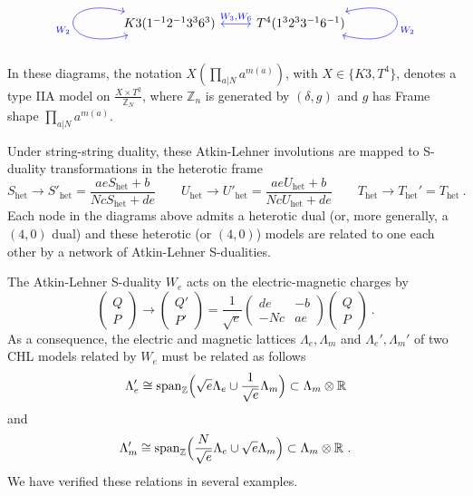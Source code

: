 \documentclass[a4paper,11pt]{article}
\newcommand{\RR}{\mathbb{R}}
\newcommand{\ZZ}{\mathbb{Z}}
\numberwithin{equation}{section}
\def\be{\begin{equation}}
\def\ee{\end{equation}}
\begin{document}
$$ \begin{tikzcd}
K3(1^{-1} 2^{-1} 3^3 6^3) \arrow[leftrightarrow,color=blue]{r}{W_3,W_{6}}\arrow[leftrightarrow,loop left,color=blue]{}{W_2} & 
T^4(1^3 2^3 3^{-1} 6^{-1})\arrow[leftrightarrow,loop right,color=blue]{}{W_2}
\end{tikzcd}
$$
In these diagrams, the notation $X(\prod_{a|N} a^{m(a)})$, with $X\in \{K3,T^4\}$, denotes a type IIA model on $\frac{X\times T^2}{\ZZ_N}$, where $\ZZ_n$ is generated by $(\delta,g)$ and $g$ has Frame shape $\prod_{a|N} a^{m(a)}$.

\medskip


Under string-string duality, these Atkin-Lehner involutions are mapped to S-duality transformations in the heterotic frame
\be S_{\text{het}}\to S'_{\text{het}}=\frac{ae S_{\text{het}}+b}{NcS_{\text{het}}+de}\qquad U_{\text{het}}\to U'_{\text{het}}=\frac{ae U_{\text{het}}+b}{NcU_{\text{het}}+de}\qquad T_{\text{het}}\to T_{\text{het}}'=T_{\text{het}}\ .
\ee Each node in the diagrams above admits a heterotic dual (or, more generally, a $(4,0)$ dual) and these heterotic (or $(4,0)$) models are related to one each other by a network of Atkin-Lehner S-dualities.

The Atkin-Lehner S-duality $W_e$ acts on the electric-magnetic charges by
\be \begin{pmatrix}
Q \\ P
\end{pmatrix}\to  \begin{pmatrix}
Q' \\ P'
\end{pmatrix}=\frac{1}{\sqrt{e}}\begin{pmatrix}
de & -b\\ -Nc & ae
\end{pmatrix} \begin{pmatrix}
Q \\ P
\end{pmatrix}\ .
\ee  As a consequence, the electric and magnetic lattices $\Lambda_e,\Lambda_m$ and $\Lambda_e',\Lambda_m'$ of two CHL models related by $W_e$ must be related as follows
\be \Lambda_e'\cong {\rm span}_\ZZ \Bigl(\sqrt{e}\Lambda_e\cup \frac{1}{\sqrt{e}}\Lambda_m\Bigr)\subset \Lambda_m\otimes \RR
\ee and
\be \Lambda_m'\cong {\rm span}_\ZZ \Bigl(\frac{N}{\sqrt{e}}\Lambda_e\cup \sqrt{e}\Lambda_m\Bigr)\subset \Lambda_m\otimes \RR\ .
\ee 
We have verified these relations in several examples.

\medskip
\end{document}
